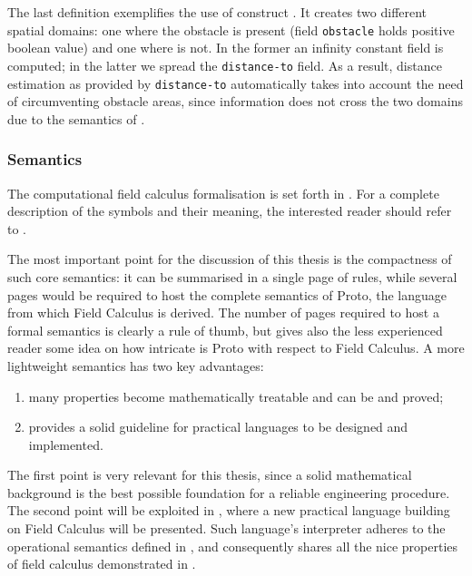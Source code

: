 \documentclass[12pt,a4paper,twoside,openright]{book}
\begin{document}
The last definition exemplifies the use of construct \ifK{}. It creates two different spatial domains: one where the obstacle is present (field {\tt obstacle} holds positive boolean value) and one where is not. In the former an infinity constant field is computed; in the latter we spread the {\tt distance-to} field.
%
As a result, distance estimation as provided by {\tt distance-to} automatically takes into account the need of circumventing obstacle areas, since information does not cross the two domains due to the semantics of \texttt{\nbrN}.

\subsubsection{Semantics}

The computational field calculus formalisation is set forth in .
%
For a complete description of the symbols and their meaning, the interested reader should refer to \cite{VDB-FOCLASA-CIC2013}.

The most important point for the discussion of this thesis is the compactness of such core semantics: it can be summarised in a single page of rules, while several pages would be required to host the complete semantics of Proto, the language from which Field Calculus is derived.
%
The number of pages required to host a formal semantics is clearly a rule of thumb, but gives also the less experienced reader some idea on how intricate is Proto with respect to Field Calculus.
%
A more lightweight semantics has two key advantages:
\begin{enumerate}
 \item many properties become mathematically treatable and can be and proved;
 \item provides a solid guideline for practical languages to be designed and implemented.
\end{enumerate}
%
The first point is very relevant for this thesis, since a solid mathematical background is the best possible foundation for a reliable engineering procedure.
%
The second point will be exploited in , where a new practical language building on Field Calculus will be presented.
%
Such language's interpreter adheres to the operational semantics defined in , and consequently shares all the nice properties of field calculus demonstrated in \cite{VDB-FOCLASA-CIC2013}.

%
\end{document}
